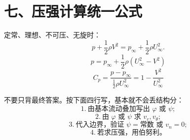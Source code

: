 \documentclass[10.5pt,a4paper]{ctexart}
\begin{document}
\section*{七、压强计算统一公式}

定常、理想、不可压、无旋时：
\[
p+\frac12\rho V^2=p_\infty+\frac12\rho U_\infty^2.
\]
\[
\boxed{p=p_\infty+\frac12\rho(U_\infty^2-V^2)}
\]
\[
\boxed{C_p=\frac{p-p_\infty}{\frac12\rho U_\infty^2}
=1-\frac{V^2}{U_\infty^2}}
\]

\begin{tcolorbox}[colback=green!3,colframe=green!40!black,title=考试时最稳的写法]
不要只背最终答案。按下面四行写，基本就不会丢结构分：
\[
1.\ \text{由基本流动叠加写出 }\varphi\text{ 或 }\psi;
\]
\[
2.\ \text{由 }\varphi\text{ 或 }\psi\text{ 求 }v_r,v_\theta;
\]
\[
3.\ \text{代入边界，验证 }\psi=\text{常数}\text{ 或 }v_n=0;
\]
\[
4.\ \text{若求压强，用伯努利。}
\]
\end{tcolorbox}
\end{document}
